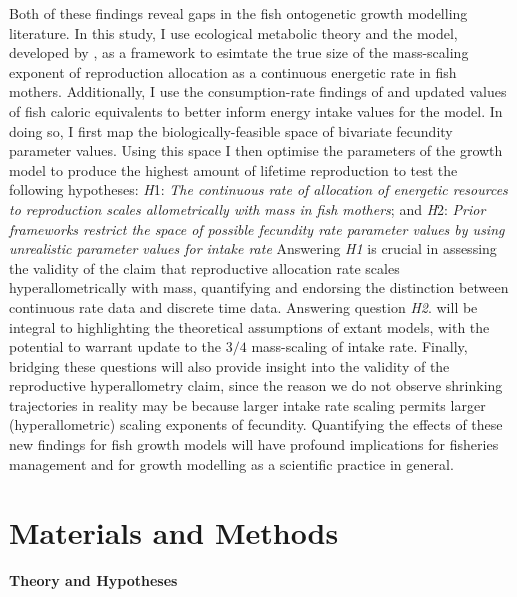 \documentclass[a4paper]{article} %
\begin{document}
    Both of these findings reveal gaps in the fish ontogenetic growth modelling literature. In this study, I use ecological metabolic theory and the \cite{West2001} model, developed by \cite{Charnov2001}, as a framework to esimtate the true size of the mass-scaling exponent of reproduction allocation as a continuous energetic rate in fish mothers. Additionally, I use the consumption-rate findings of \cite{Pawar2012} and updated values of fish caloric equivalents to better inform energy intake values for the model. In doing so, I first map the biologically-feasible space of bivariate fecundity parameter values. Using this space I then optimise the parameters of the growth model to produce the highest amount of lifetime reproduction to test the following hypotheses: \textit{H}1: \textit{The continuous rate of allocation of energetic resources to reproduction scales allometrically with mass in fish mothers}; and \textit{H}2: \textit{Prior frameworks restrict the space of possible fecundity rate parameter values by using unrealistic parameter values for intake rate}
    Answering \textit{H1} is crucial in assessing the validity of the claim that reproductive allocation rate scales hyperallometrically with mass, quantifying and endorsing the distinction between continuous rate data and discrete time data. Answering question \textit{H2}. will be integral to highlighting the theoretical assumptions of extant models, with the potential to warrant update to the $3/4$ mass-scaling of intake rate. Finally, bridging these questions will also provide insight into the validity of the reproductive hyperallometry claim, since the reason we do not observe shrinking trajectories in reality may be because larger intake rate scaling permits larger (hyperallometric) scaling exponents of fecundity. Quantifying the effects of these new findings for fish growth models will have profound implications for fisheries management and for growth modelling as a scientific practice in general.

\section{Materials and Methods}\thispagestyle{plain}
\textbf{Theory and Hypotheses}
\end{document}

